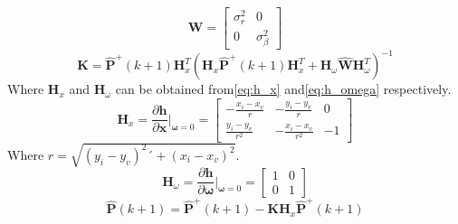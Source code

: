 \begin{equation}
    \label{eq:sensor_covariance}
    \mathbf{W} = 
    \begin{bmatrix}
        \sigma_r^2 & 0 \\
        0 & \sigma_{\beta}^2
    \end{bmatrix}
\end{equation}
\begin{equation}
    \label{eq:kalman_gain}
    \mathbf{K} = \hat{\mathbf{P}}^+(k+1) \mathbf{H}_x^T (\mathbf{H}_x \hat{\mathbf{P}}^+(k+1) \mathbf{H}_x^T + \mathbf{H}_{\omega} \hat{\mathbf{W}} \mathbf{H}_{\omega}^T)^{-1}
\end{equation}
Where $\mathbf{H}_x$ and $\mathbf{H}_{\omega}$ can be obtained from\:\eqref{eq:h_x} and\:\eqref{eq:h_omega} respectively\:\cite{corke_robotics_2023}.
\begin{equation}
    \label{eq:h_x}
    \mathbf{H}_x = \frac{\partial \mathbf{h}}{\partial \mathbf{x}} \bigg\rvert_{\mathbf{\omega} = 0} =
    \begin{bmatrix}
        -\frac{x_i-x_v}{r} & -\frac{y_i-y_v}{r} & 0 \\
        \frac{y_i-y_v}{r^2} & -\frac{x_i-x_v}{r^2} & -1
    \end{bmatrix}
\end{equation}
Where $r = \sqrt{(y_i - y_v)^2 ´+ (x_i - x_v)^2}$.
\begin{equation}
    \label{eq:h_omega}
    \mathbf{H}_{\omega} = \frac{\partial \mathbf{h}}{\partial \mathbf{\omega}} \bigg\rvert_{\mathbf{\omega} = 0} =
    \begin{bmatrix}
        1 & 0 \\
        0 & 1
    \end{bmatrix}
\end{equation}
\begin{equation}
    \label{eq:correction_update_covariance}
    \hat{\mathbf{P}}(k+1) = \hat{\mathbf{P}}^+(k+1) - \mathbf{K} \mathbf{H}_x \hat{\mathbf{P}}^+(k+1)
\end{equation}


